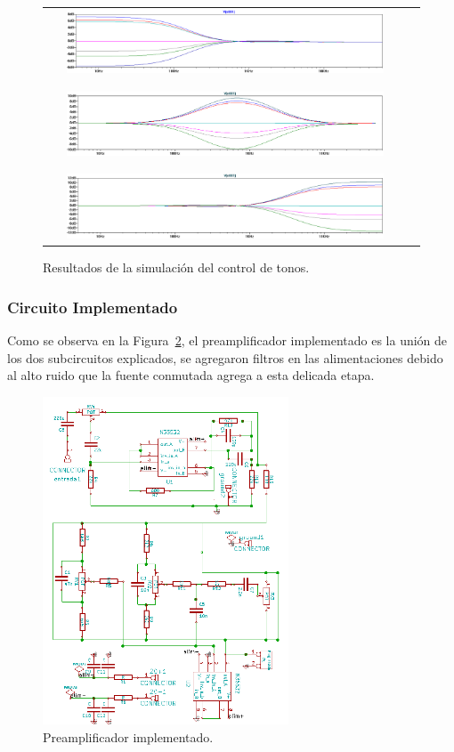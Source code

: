 \begin{figure}[H]
\centering
\begin{tabular}{cc}
\includegraphics[width=0.9\textwidth]{img/tonos_sim_1.png}\\
\\
\\
\includegraphics[width=0.9\textwidth]{img/tonos_sim_2.png}\\
\\
\\
\includegraphics[width=0.9\textwidth]{img/tonos_sim_3.png}
\end{tabular}
\caption{Resultados de la simulación del control de tonos.}
\label{tonos_sim} 
\end{figure}
\medskip
\subsubsection{Circuito Implementado}
\medskip
Como se observa en la Figura~\ref{pre_cir}, el preamplificador implementado es la unión de los dos subcircuitos explicados, se agregaron filtros en las alimentaciones debido al alto ruido que la fuente conmutada agrega a esta delicada etapa.

\begin{figure}[H]
\centering
\includegraphics[width=0.65\textwidth]{img/pre_cir.png}
\caption{Preamplificador implementado.}
\label{pre_cir} 
\end{figure}
\medskip